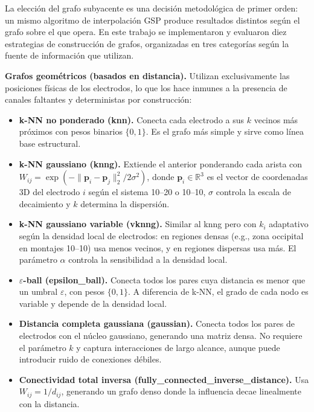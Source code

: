 La elección del grafo subyacente es una decisión metodológica de primer orden: un mismo algoritmo de interpolación GSP produce resultados distintos según el grafo sobre el que opera. En este trabajo se implementaron y evaluaron diez estrategias de construcción de grafos, organizadas en tres categorías según la fuente de información que utilizan.

\textbf{Grafos geométricos (basados en distancia).} Utilizan exclusivamente las posiciones físicas de los electrodos, lo que los hace inmunes a la presencia de canales faltantes y deterministas por construcción:

\begin{itemize}[leftmargin=*,itemsep=1pt,topsep=2pt]
\item \textbf{k-NN no ponderado (knn).} Conecta cada electrodo a sus $k$ vecinos más próximos con pesos binarios $\{0,1\}$. Es el grafo más simple y sirve como línea base estructural.
\item \textbf{k-NN gaussiano (knng).} Extiende el anterior ponderando cada arista con $W_{ij} = \exp(-\|\mathbf{p}_i - \mathbf{p}_j\|_2^2 / 2\sigma^2)$, donde $\mathbf{p}_i \in \mathbb{R}^3$ es el vector de coordenadas 3D del electrodo $i$ según el sistema 10--20 o 10--10, $\sigma$ controla la escala de decaimiento y $k$ determina la dispersión.
\item \textbf{k-NN gaussiano variable (vknng).} Similar al knng pero con $k_i$ adaptativo según la densidad local de electrodos: en regiones densas (e.g., zona occipital en montajes 10--10) usa menos vecinos, y en regiones dispersas usa más. El parámetro $\alpha$ controla la sensibilidad a la densidad local.
\item \textbf{$\varepsilon$-ball (epsilon\_ball).} Conecta todos los pares cuya distancia es menor que un umbral $\varepsilon$, con pesos $\{0,1\}$. A diferencia de k-NN, el grado de cada nodo es variable y depende de la densidad local.
\item \textbf{Distancia completa gaussiana (gaussian).} Conecta todos los pares de electrodos con el núcleo gaussiano, generando una matriz densa. No requiere el parámetro $k$ y captura interacciones de largo alcance, aunque puede introducir ruido de conexiones débiles.
\item \textbf{Conectividad total inversa (fully\_connected\_inverse\_distance).} Usa $W_{ij} = 1/d_{ij}$, generando un grafo denso donde la influencia decae linealmente con la distancia.
\end{itemize}

